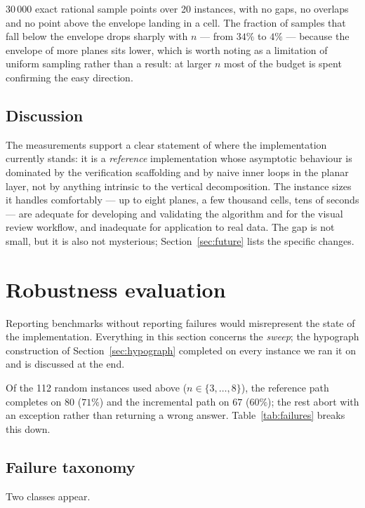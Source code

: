 \documentclass[11pt]{article}
\begin{document}
30\,000 exact rational sample points over 20 instances, with no gaps, no
overlaps and no point above the envelope landing in a cell.  The fraction of
samples that fall below the envelope drops sharply with $n$ --- from $34\%$ to
$4\%$ --- because the envelope of more planes sits lower, which is worth noting
as a limitation of uniform sampling rather than a result: at larger $n$ most of
the budget is spent confirming the easy direction.

\subsection{Discussion}

The measurements support a clear statement of where the implementation
currently stands: it is a \emph{reference} implementation whose asymptotic
behaviour is dominated by the verification scaffolding and by naive inner loops
in the planar layer, not by anything intrinsic to the vertical decomposition.
The instance sizes it handles comfortably --- up to eight planes, a few
thousand cells, tens of seconds --- are adequate for developing and validating
the algorithm and for the visual review workflow, and inadequate for
application to real data.  The gap is not small, but it is also not mysterious;
Section~\ref{sec:future} lists the specific changes.

\section{Robustness evaluation}
\label{sec:robustness}

Reporting benchmarks without reporting failures would misrepresent the state of
the implementation.  Everything in this section concerns the \emph{sweep}; the
hypograph construction of Section~\ref{sec:hypograph} completed on every
instance we ran it on and is discussed at the end.

Of the 112 random instances used above ($n \in \{3,\dots,8\}$), the reference
path completes on $80$ ($71\%$) and the incremental path on $67$ ($60\%$); the
rest abort with an exception rather than returning a wrong answer.
Table~\ref{tab:failures} breaks this down.

\subsection{Failure taxonomy}



Two classes appear.
\end{document}
